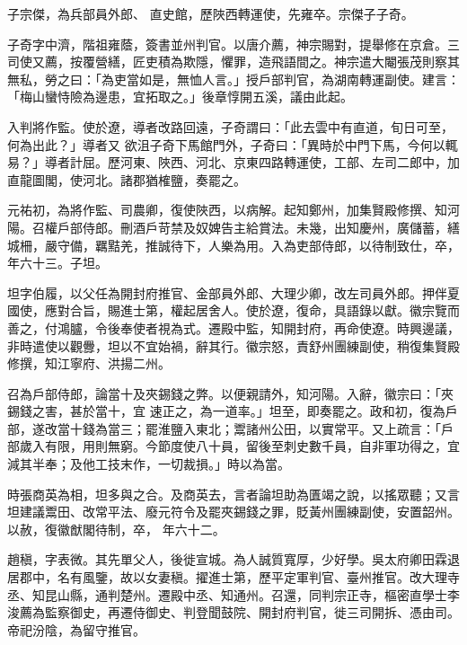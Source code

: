 \begin{pinyinscope}
 子宗傑，為兵部員外郎、
 直史館，歷陜西轉運使，先雍卒。宗傑子子奇。



 子奇字中濟，階祖雍蔭，簽書並州判官。以唐介薦，神宗賜對，提舉修在京倉。三司使又薦，按覆營繕，匠吏積為欺隱，懼罪，造飛語間之。神宗遣大閹張茂則察其無私，勞之曰：「為吏當如是，無恤人言。」授戶部判官，為湖南轉運副使。建言：「梅山蠻恃險為邊患，宜拓取之。」後章惇開五溪，議由此起。



 入判將作監。使於遼，導者改路回遠，子奇謂曰：「此去雲中有直道，旬日可至，何為出此？」導者又
 欲沮子奇下馬館門外，子奇曰：「異時於中門下馬，今何以輒易？」導者計屈。歷河東、陜西、河北、京東四路轉運使，工部、左司二郎中，加直龍圖閣，使河北。諸郡猶榷鹽，奏罷之。



 元祐初，為將作監、司農卿，復使陜西，以病解。起知鄭州，加集賢殿修撰、知河陽。召權戶部侍郎。刪酒戶苛禁及奴婢告主給賞法。未幾，出知慶州，廣儲蓄，繕城柵，嚴守備，羈黠羌，推誠待下，人樂為用。入為吏部侍郎，以待制致仕，卒，年六十三。子坦。



 坦字伯履，以父任為開封府推官、金部員外郎、大理少卿，改左司員外郎。押伴夏國使，應對合旨，賜進士第，權起居舍人。使於遼，復命，具語錄以獻。徽宗覽而善之，付鴻臚，令後奉使者視為式。遷殿中監，知開封府，再命使遼。時興邊議，非時遣使以觀釁，坦以不宜始禍，辭其行。徽宗怒，責舒州團練副使，稍復集賢殿修撰，知江寧府、洪揚二州。



 召為戶部侍郎，論當十及夾錫錢之弊。以便親請外，知河陽。入辭，徽宗曰：「夾錫錢之害，甚於當十，宜
 速正之，為一道率。」坦至，即奏罷之。政和初，復為戶部，遂改當十錢為當三；罷淮鹽入東北；鬻諸州公田，以實常平。又上疏言：「戶部歲入有限，用則無窮。今節度使八十員，留後至刺史數千員，自非軍功得之，宜減其半奉；及他工技末作，一切裁損。」時以為當。



 時張商英為相，坦多與之合。及商英去，言者論坦助為匱竭之說，以搖眾聽；又言坦建議鬻田、改常平法、廢元符令及罷夾錫錢之罪，貶黃州團練副使，安置韶州。以赦，復徽猷閣待制，卒，
 年六十二。



 趙稹，字表微。其先單父人，後徙宣城。為人誠質寬厚，少好學。吳太府卿田霖退居郡中，名有風鑒，故以女妻稹。擢進士第，歷平定軍判官、臺州推官。改大理寺丞、知昆山縣，通判楚州。遷殿中丞、知通州。召還，同判宗正寺，樞密直學士李浚薦為監察御史，再遷侍御史、判登聞鼓院、開封府判官，徙三司開拆、憑由司。帝祀汾陰，為留守推官。




\end{pinyinscope}
